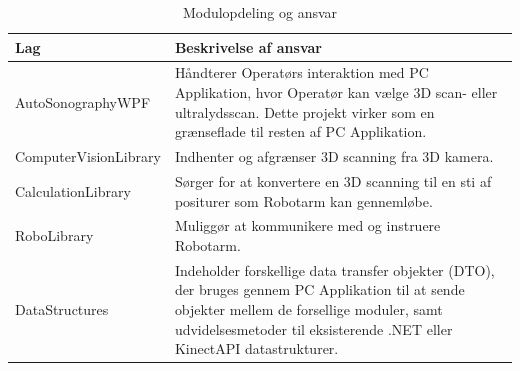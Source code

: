 \begin{table}[htb]
\begin{tabular}{ | l | p{} | }
\hline
\textbf{Lag} & \textbf{Beskrivelse af ansvar} \\\hline
AutoSonographyWPF & Håndterer Operatørs interaktion med PC Applikation, hvor Operatør kan vælge 3D scan- eller ultralydsscan. Dette projekt virker som en grænseflade til resten af PC Applikation.\\\hline
ComputerVisionLibrary & Indhenter og afgrænser 3D scanning fra 3D kamera. \\\hline
CalculationLibrary & Sørger for at konvertere en 3D scanning til en sti af positurer som Robotarm kan gennemløbe. \\\hline
RoboLibrary & Muliggør at kommunikere med og instruere Robotarm.\\\hline
DataStructures & Indeholder forskellige data transfer objekter (DTO), der bruges gennem PC Applikation til at sende objekter mellem de forsellige moduler, samt udvidelsesmetoder til eksisterende .NET eller KinectAPI datastrukturer.\\\hline
\end{tabular}
\caption{Modulopdeling og ansvar}
\end{table}
